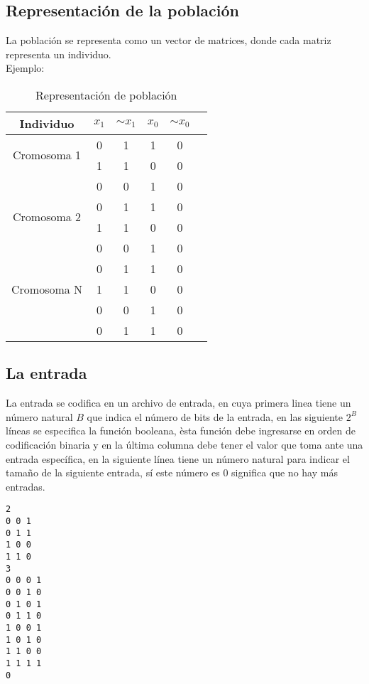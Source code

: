 \documentclass[a4paper]{article}
\begin{document}
\subsection{Representación de la población}

La población se representa como un vector de matrices, donde cada matriz representa un individuo.\\
Ejemplo:
\begin{table}[H]
	\centering
	\caption{Representación de población}
	\begin{tabular}{| c |c | c | c|  c|  c|}
		\hline
		Individuo & $x_1$ & $ \sim{x_1}$ & $x_0$ & $ \sim{x_0}$\\
		\hline
		\multirow{2}{4cm}{Cromosoma 1} &0 & 1& 1 & 0\\
		\cline{2-5}
		& 1 & 1& 0 & 0\\
		\cline{2-5}
		& 0 & 0& 1 & 0\\
		\hline
		\hline
		\multirow{2}{4cm}{Cromosoma 2}  & 0 & 1& 1 & 0\\
		\cline{2-5}
		& 1 & 1& 0 & 0\\
		\cline{2-5}
		& 0 & 0& 1 & 0\\
		\hline
		\hline
		\multirow{3}{4cm}{Cromosoma N}  & 0 & 1& 1 & 0\\
		\cline{2-5}
		& 1 & 1& 0 & 0\\
		\cline{2-5}
		& 0 & 0& 1 & 0\\
		\cline{2-5}
		& 0 & 1& 1 & 0\\
		\hline
	\end{tabular}
\end{table}



\subsection{La entrada}

La entrada se codifica en un archivo de entrada, en cuya primera linea tiene un número natural $B$ que indica el número de bits de la entrada, en las siguiente $2^B$ líneas se especifica la función booleana, èsta función debe ingresarse en orden de codificación binaria y en la última columna debe tener el valor que toma ante una entrada específica, en la siguiente línea tiene un número natural para indicar el tamaño de la siguiente entrada, sí este número es $0$ significa que no hay más entradas.

\lstset{frameround=fttt}
\begin{lstlisting}[frame=trBL]
2
0 0 1
0 1 1
1 0 0
1 1 0
3
0 0 0 1
0 0 1 0 
0 1 0 1
0 1 1 0
1 0 0 1
1 0 1 0
1 1 0 0
1 1 1 1
0
\end{lstlisting}
\end{document}
